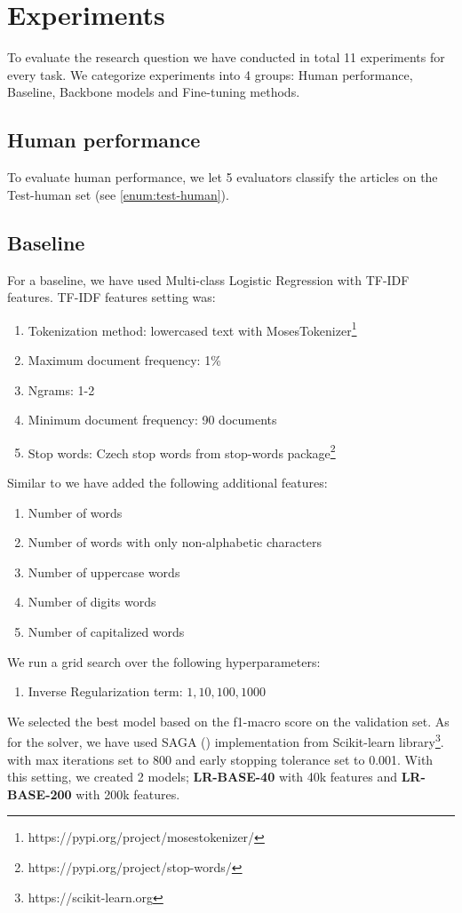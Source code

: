 \chapter{Experiments}
\label{chap:experiments}
To evaluate the research question we have conducted in total 11 experiments for every task.
We categorize experiments into 4 groups: Human performance, Baseline, Backbone models and Fine-tuning methods.

\section{Human performance}
\label{sec:human}
To evaluate human performance, we let 5 evaluators classify the articles on the Test-human set (see \autoref{enum:test-human}).

\section{Baseline}
For a baseline, we have used Multi-class Logistic Regression with TF-IDF features.
TF-IDF features setting was:
\begin{enumerate}
    \item Tokenization method: lowercased text with MosesTokenizer\footnote{https://pypi.org/project/mosestokenizer/}
    \item Maximum document frequency: 1\%
    \item Ngrams: 1-2
    \item Minimum document frequency: 90 documents
    \item Stop words: Czech stop words from stop-words package\footnote{https://pypi.org/project/stop-words/}
\end{enumerate}
Similar to \cite{strakaSumeCzechLargeCzech2018a} we have added the following additional features:
\begin{enumerate}
    \item Number of words
    \item Number of words with only non-alphabetic characters
    \item Number of uppercase words
    \item Number of digits words
    \item Number of capitalized words
\end{enumerate}


We run a grid search over the following hyperparameters:
\begin{enumerate}
    \item Inverse Regularization term: $1, 10, 100, 1000$
\end{enumerate}
We selected the best model based on the f1-macro score on the validation set.
As for the solver, we have used SAGA (\cite{defazioSAGAFastIncremental2014})
 implementation from Scikit-learn library\footnote{https://scikit-learn.org}.
with max iterations set to 800 and early stopping tolerance set to 0.001.
With this setting, we created 2 models; \textbf{LR-BASE-40} with 40k features
 and \textbf{LR-BASE-200} with 200k features.

